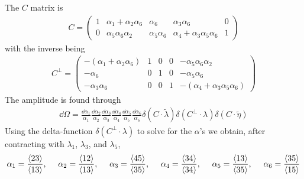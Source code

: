 \documentclass[letter,11pt]{article}
\begin{document}
\noindent
The $C$ matrix is
\begin{equation}
	\begin{aligned}
		C=\begin{pmatrix}
			1 & \alpha_1+\alpha_2\alpha_6 & \alpha_6 & \alpha_3\alpha_6 & 0\\
			0 & \alpha_5 \alpha_6 \alpha_2 & \alpha_5 \alpha_6 & \alpha_4+\alpha_3\alpha_5\alpha_6 & 1
		\end{pmatrix}
	\end{aligned}
\end{equation}
with the inverse being
\begin{equation}
	\begin{aligned}
		C^\perp =\begin{pmatrix}
			-(\alpha_1+\alpha_2\alpha_6) & 1 & 0 & 0 & -\alpha_5 \alpha_6 \alpha_2\\
			-\alpha_6 & 0 & 1 & 0 & -\alpha_5 \alpha_6 \\
			-\alpha_3 \alpha_6 & 0 & 0 & 1 & -(\alpha_4+\alpha_3\alpha_5\alpha_6)
		\end{pmatrix}
	\end{aligned}
\end{equation}
The amplitude is found through
\begin{equation}
	\begin{aligned}
		\dd \Omega =\frac{\dd \alpha_1}{\alpha_1}\frac{\dd \alpha_2}{\alpha_2}\frac{\dd \alpha_3}{\alpha_3}\frac{\dd \alpha_4}{\alpha_4}\frac{\dd \alpha_5}{\alpha_5}\frac{\dd \alpha_6}{\alpha_6}\delta(C\cdot \tilde \lambda) \delta(C^\perp\cdot \lambda)\delta(C\cdot \tilde \eta)
	\end{aligned}
\end{equation}
Using the delta-function $\delta(C^\perp\cdot \lambda)$ to solve for the $\alpha$'s we obtain, after contracting with $\lambda_1$, $\lambda_3$, and $\lambda_5$,
\begin{equation}
	\begin{aligned}
		\alpha_1=\frac{\expval{23}}{\expval{13}},~~~~
		\alpha_2=\frac{\expval{12}}{\expval{13}},~~~~
		\alpha_3=\frac{\expval{45}}{\expval{35}},~~~~
		\alpha_4=\frac{\expval{34}}{\expval{34}},~~~~
		\alpha_5=\frac{\expval{13}}{\expval{35}},~~~~
		\alpha_6=\frac{\expval{35}}{\expval{15}}
	\end{aligned}
\end{equation}
\end{document}
